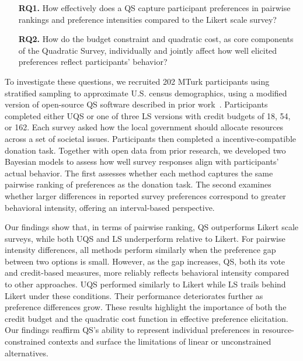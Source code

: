 \begin{itemize}
    \item [\textbf{RQ1.}] How effectively does a QS capture participant preferences in pairwise rankings and preference intensities compared to the Likert scale survey?
    \item [\textbf{RQ2.}] How do the budget constraint and quadratic cost, as core components of the Quadratic Survey, individually and jointly affect how well elicited preferences reflect participants' behavior?
\end{itemize}


To investigate these questions, we recruited 202 MTurk participants using stratified sampling to approximate U.S. census demographics, using a modified version of open-source QS software described in prior work~\cite{chengCanShowWhat2021}. Participants completed either UQS or one of three LS versions with credit budgets of 18, 54, or 162. Each survey asked how the local government should allocate resources across a set of societal issues. Participants then completed a incentive-compatible donation task. Together with open data from prior research, we developed two Bayesian models to assess how well survey responses align with participants' actual behavior. The first assesses whether each method captures the same pairwise ranking of preferences as the donation task. The second examines whether larger differences in reported survey preferences correspond to greater behavioral intensity, offering an interval-based perspective.

Our findings show that, in terms of pairwise ranking, QS outperforms Likert scale surveys, while both UQS and LS underperform relative to Likert. For pairwise intensity differences, all methods perform similarly when the preference gap between two options is small. However, as the gap increases, QS, both its vote and credit-based measures, more reliably reflects behavioral intensity compared to other approaches. UQS performed similarly to Likert while LS trails behind Likert under these conditions. Their performance deteriorates further as preference differences grow. These results highlight the importance of both the credit budget and the quadratic cost function in effective preference elicitation. Our findings reaffirm QS's ability to represent individual preferences in resource-constrained contexts and surface the limitations of linear or unconstrained alternatives.

